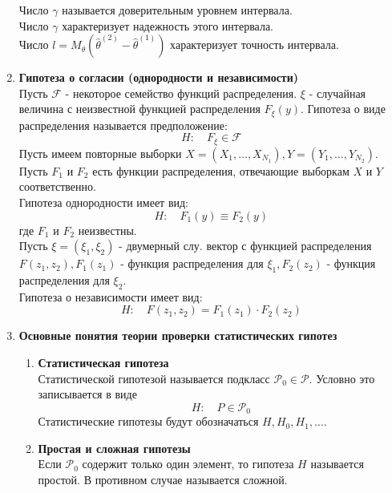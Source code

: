 \documentclass[A4]{article}
\begin{document}
\begin{enumerate}
\begin{equation}
	\end{equation}
	Число $\gamma$ называется доверительным уровнем интервала.\\
	Число $\gamma$ характеризует надежность этого интервала.\\
	Число $l=M_{\theta}(\hat{\theta}^{(2)}-\hat{\theta}^{(1)})$ характеризует точность интервала.
	\item \textbf{Гипотеза о согласии (однородности и независимости)}\\
	Пусть $\mathcal{F}$ - некоторое семейство функций распределения. $\xi$ - случайная величина с неизвестной функцией распределения $F_{\xi}(y)$. Гипотеза о виде распределения называется предположение:
	\begin{equation}
	H:\quad F_{\xi}\in\mathcal{F}
	\end{equation}
	Пусть имеем повторные выборки $X=(X_1,\ldots,X_{N_1}),Y=(Y_1,\ldots,Y_{N_2})$. Пусть $F_1$ и $F_2$ есть функции распределения, отвечающие выборкам $X$ и $Y$ соответственно.\\
	Гипотеза однородности имеет вид:
	\begin{equation}
	H:\quad F_1(y)\equiv F_2(y)
	\end{equation}
	где $F_1$ и $F_2$ неизвестны.\\
	Пусть $\xi=(\xi_1,\xi_2)$ - двумерный слу. вектор с функцией распределения $F(z_1,z_2), F_1(z_1)$ - функция распределения для $\xi_1, F_2(z_2)$ - функция распределения для $\xi_2$.\\
	Гипотеза о независимости имеет вид:
	\begin{equation}
	H:\quad F(z_1,z_2)=F_1(z_1)\cdot F_2(z_2)
	\end{equation}
	\item \textbf{Основные понятия теории проверки статистических гипотез}
	\begin{enumerate}
		\item \textbf{Статистическая гипотеза}\\
		Статистической гипотезой называется подкласс $\mathcal{P}_0\in\mathcal{P}$. Условно это записывается в виде
		\begin{equation}
		H:\quad P\in\mathcal{P}_0
		\end{equation} 
		Статистические гипотезы будут обозначаться $H,H_0,H_1,\ldots$. 
		\item \textbf{Простая и сложная гипотезы}\\
		Если $\mathcal{P}_0$ содержит только один элемент, то гипотеза $H$ называется простой. В противном случае называется сложной.

\end{enumerate}
\end{enumerate}
\end{document}
